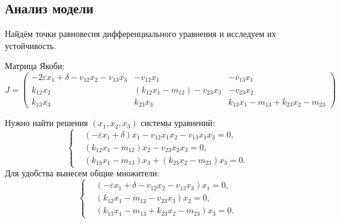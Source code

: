 \subsection{Анализ модели}
    Найдём точки равновесия дифференциального уравнения и исследуем их устойчивость.

    Матрица Якоби:
    \[
        J = \left(
            \begin{matrix}
                -2 \varepsilon x_1 + \delta - v_{12} x_2 - v_{13} x_3 & -v_{12}  x_1  & -v_{13} x_1 \\
                k_{12} x_2 & \left( k_{12} x_1 - m_{12} \right) - v_{23} x_3 & -v_{23} x_2 \\
                k_{13} x_3 & k_{23} x_3 & k_{13} x_1 - m_{13} + k_{23} x_2 - m_{23}
            \end{matrix}
        \right)
    \]

    Нужно найти решения \( (x_1, x_2, x_3) \) системы уравнений:
    \[
        \left\{\begin{split}
            & \left( -\varepsilon x_1 + \delta \right)x_1 - v_{12} x_1 x_2 - v_{13} x_1 x_3 = 0, \\
            & \left( k_{12} x_1 - m_{12} \right)x_2 - v_{23} x_2 x_3 = 0, \\
            & \left( k_{13} x_1 - m_{13} \right)x_3 + \left( k_{23} x_2 - m_{23} \right)x_3 = 0. 
        \end{split}\right.
    \]
    Для удобства вынесем общие множители:
    \[
        \left\{\begin{split}
            & \left( -\varepsilon x_1 + \delta - v_{12} x_2 - v_{13} x_3\right)x_1 = 0, \\
            & \left( k_{12} x_1 - m_{12} - v_{23} x_3 \right)x_2 = 0, \\
            & \left( k_{13} x_1 - m_{13} + k_{23} x_2 - m_{23} \right)x_3  = 0. 
        \end{split}\right.
    \]

